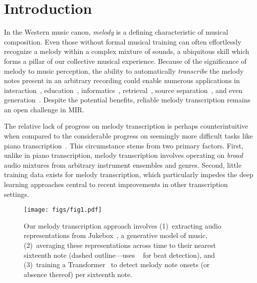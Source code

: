 \section{Introduction}\label{sec:introduction}

In the Western music canon, 
\emph{melody} is a defining characteristic of musical composition. 
Even those without formal musical training can often effortlessly recognize a melody within a complex mixture of sounds, 
a ubiquitous skill which forms a pillar of our collective musical experience. %
Because of the significance of melody to music perception, 
the ability to automatically \emph{transcribe} the melody notes present in an arbitrary recording 
could enable numerous applications in 
interaction~\cite{ryynanen2008accompaniment}, 
education~\cite{droe2006music}, 
informatics~\cite{bainbridge1999towards}, 
retrieval~\cite{ghias1995query}, 
source separation~\cite{ewert2014score},
and even generation~\cite{hawthorne2019enabling}.
Despite the potential benefits, 
reliable melody transcription remains an open challenge in MIR.

The relative lack of progress on melody transcription is perhaps counterintuitive when compared to the considerable progress on seemingly more difficult tasks like piano transcription~\cite{sigtia2016end,hawthorne2017onsets}.
This circumstance stems from two primary factors. 
First, unlike in piano transcription, melody transcription involves operating on \emph{broad}
audio mixtures from arbitrary instrument ensembles and genres. 
Second, little training data exists for melody transcription, which particularly impedes the deep learning approaches central to recent improvements in other transcription settings. 

\begin{figure}
    \centering
    \texttt{[image: figs/fig1.pdf]}
    \caption{
Our melody transcription approach involves 
(1)~extracting audio representations from Jukebox~\cite{dhariwal2020jukebox}, a generative model of music, 
(2)~averaging these representations across time to their nearest sixteenth note (dashed outline---uses \madmom{}~\cite{bock2016joint,bock2016madmom} for beat detection),
and
(3)~training a Transformer~\cite{vaswani2017attention} to detect melody note onsets (or absence thereof) per sixteenth note. 
}
 \label{fig:fig1}
\end{figure}

